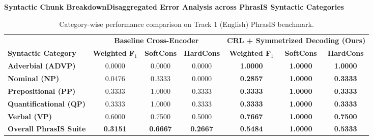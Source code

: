 \documentclass[aspectratio=169,10pt]{beamer}
\begin{document}
\begin{frame}{\textbf{Syntactic Chunk Breakdown}}{\textbf{Disaggregated Error Analysis across PhrasIS Syntactic Categories}}
  \small
  \begin{table}[h]
    \centering
    \footnotesize
    \begin{tabular}{l ccc ccc}
      \toprule
      & \multicolumn{3}{c}{\textbf{Baseline Cross-Encoder}} & \multicolumn{3}{c}{\textbf{CRL + Symmetrized Decoding (Ours)}} \\
      \cmidrule(lr){2-4} \cmidrule(lr){5-7}
      \textbf{Syntactic Category} & \textbf{Weighted F$_1$} & \textbf{SoftCons} & \textbf{HardCons} & \textbf{Weighted F$_1$} & \textbf{SoftCons} & \textbf{HardCons} \\
      \midrule
      \textbf{Adverbial (ADVP)} & 0.0000 & 0.0000 & 0.0000 & \textbf{1.0000} & \textbf{1.0000} & \textbf{1.0000} \\
      \textbf{Nominal (NP)} & 0.0476 & 0.3333 & 0.0000 & \textbf{0.2857} & \textbf{1.0000} & \textbf{0.3333} \\
      \textbf{Prepositional (PP)} & 0.3333 & 1.0000 & 0.3333 & \textbf{0.3333} & \textbf{1.0000} & \textbf{0.3333} \\
      \textbf{Quantificational (QP)} & 0.3333 & 1.0000 & 0.3333 & \textbf{0.3333} & \textbf{1.0000} & \textbf{0.3333} \\
      \textbf{Verbal (VP)} & 0.6000 & 0.7500 & 0.5000 & \textbf{0.7667} & \textbf{1.0000} & \textbf{0.7500} \\
      \midrule
      \textbf{Overall PhrasIS Suite} & \textbf{0.3151} & \textbf{0.6667} & \textbf{0.2667} & \textbf{0.5484} & \textbf{1.0000} & \textbf{0.5333} \\
      \bottomrule
    \end{tabular}
    \caption{Category-wise performance comparison on Track 1 (English) PhrasIS benchmark.}
  \end{table}


\end{frame}
\end{document}

